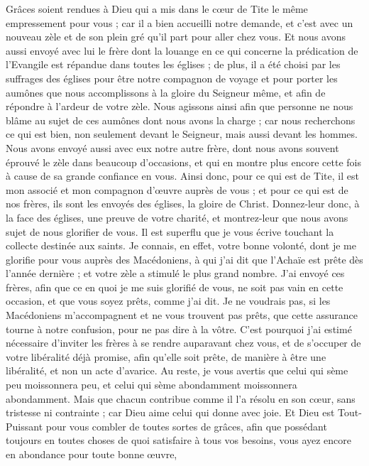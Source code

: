 \begin{multicols}{2}
Grâces soient rendues à Dieu qui a mis dans le cœur de Tite le même empressement pour vous ;
car il a bien accueilli notre demande, et c’est avec un nouveau zèle et de son plein gré qu’il part pour aller chez vous.
Et nous avons aussi envoyé avec lui le frère dont la louange en ce qui concerne la prédication de l'Evangile est répandue dans toutes les églises ;
de plus, il a été choisi par les suffrages des églises pour être notre compagnon de voyage et pour porter les aumônes que nous accomplissons à la gloire du Seigneur même, et afin de répondre à l’ardeur de votre zèle.
Nous agissons ainsi afin que personne ne nous blâme au sujet de ces aumônes dont nous avons la charge ;
car nous recherchons ce qui est bien, non seulement devant le Seigneur, mais aussi devant les hommes.
Nous avons envoyé aussi avec eux notre autre frère, dont nous avons souvent éprouvé le zèle dans beaucoup d’occasions, et qui en montre plus encore cette fois à cause de sa grande confiance en vous.
Ainsi donc, pour ce qui est de Tite, il est mon associé et mon compagnon d’œuvre auprès de vous ; et pour ce qui est de nos frères, ils sont les envoyés des églises, la gloire de Christ.
Donnez-leur donc, à la face des églises, une preuve de votre charité, et montrez-leur que nous avons sujet de nous glorifier de vous.
\VerseOne{}Il est superflu que je vous écrive touchant la collecte destinée aux saints.
Je connais, en effet, votre bonne volonté, dont je me glorifie pour vous auprès des Macédoniens, à qui j’ai dit que l’Achaïe est prête dès l'année dernière ; et votre zèle a stimulé le plus grand nombre.
J’ai envoyé ces frères, afin que ce en quoi je me suis glorifié de vous, ne soit pas vain en cette occasion, et que vous soyez prêts, comme j'ai dit.
Je ne voudrais pas, si les Macédoniens m’accompagnent et ne vous trouvent pas prêts, que cette assurance tourne à notre confusion, pour ne pas dire à la vôtre.
C'est pourquoi j'ai estimé nécessaire d’inviter les frères à se rendre auparavant chez vous, et de s’occuper de votre libéralité déjà promise, afin qu'elle soit prête, de manière à être une libéralité, et non un acte d’avarice.
Au reste, je vous avertis que celui qui sème peu moissonnera peu, et celui qui sème abondamment moissonnera abondamment.
Mais que chacun contribue comme il l’a résolu en son cœur, sans tristesse ni contrainte ; car Dieu aime celui qui donne avec joie.
Et Dieu est Tout-Puissant pour vous combler de toutes sortes de grâces, afin que possédant toujours en toutes choses de quoi satisfaire à tous vos besoins, vous ayez encore en abondance pour toute bonne œuvre,

\end{multicols}
